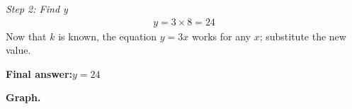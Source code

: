 \documentclass[11pt]{article}
\begin{document}
\textit{Step 2: Find y}
\[\begin{gathered}
y = 3 \times 8 = 24
\end{gathered}\]
Now that \( k \) is known, the equation \( y = 3x \) works for any \( x \); substitute the new value.

\begin{answerbox}
\textbf{Final answer:}\quad \(\displaystyle y = 24\)
\end{answerbox}
\textbf{Graph.}

\begin{center}
\end{center}
\end{document}
